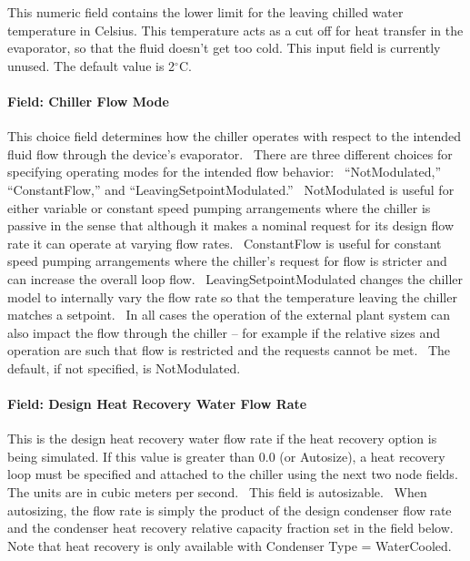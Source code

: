 This numeric field contains the lower limit for the leaving chilled water temperature in Celsius. This temperature acts as a cut off for heat transfer in the evaporator, so that the fluid doesn't get too cold. This input field is currently unused. The default value is 2$^\circ$C.

\paragraph{Field: Chiller Flow Mode}\label{field-chiller-flow-mode-4}

This choice field determines how the chiller operates with respect to the intended fluid flow through the device's evaporator.~ There are three different choices for specifying operating modes for the intended flow behavior:~ ``NotModulated,'' ``ConstantFlow,'' and ``LeavingSetpointModulated.''~ NotModulated is useful for either variable or constant speed pumping arrangements where the chiller is passive in the sense that although it makes a nominal request for its design flow rate it can operate at varying flow rates.~ ConstantFlow is useful for constant speed pumping arrangements where the chiller's request for flow is stricter and can increase the overall loop flow.~ LeavingSetpointModulated changes the chiller model to internally vary the flow rate so that the temperature leaving the chiller matches a setpoint.~ In all cases the operation of the external plant system can also impact the flow through the chiller -- for example if the relative sizes and operation are such that flow is restricted and the requests cannot be met.~ The default, if not specified, is NotModulated.

\paragraph{Field: Design Heat Recovery Water Flow Rate}\label{field-design-heat-recovery-water-flow-rate-1-000}

This is the design heat recovery water flow rate if the heat recovery option is being simulated. If this value is greater than 0.0 (or Autosize), a heat recovery loop must be specified and attached to the chiller using the next two node fields. The units are in cubic meters per second.~ This field is autosizable.~ When autosizing, the flow rate is simply the product of the design condenser flow rate and the condenser heat recovery relative capacity fraction set in the field below. Note that heat recovery is only available with Condenser Type = WaterCooled.

